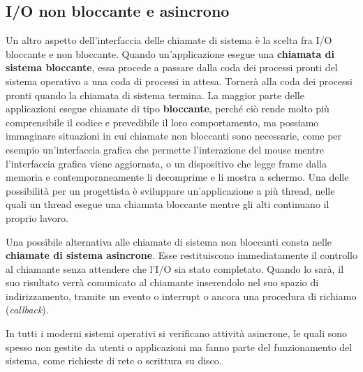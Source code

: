     \subsection{I/O non bloccante e asincrono}
        Un altro aspetto dell'interfaccia delle chiamate di sistema è la scelta fra I/O bloccante e non bloccante. Quando un'applicazione esegue una \textbf{chiamata di sistema bloccante}, essa procede a passare dalla coda dei processi pronti del sistema operativo a una coda di processi in attesa. Tornerà alla coda dei processi pronti quando la chiamata di sistema termina. La maggior parte delle applicazioni esegue chiamate di tipo \textbf{bloccante}, perché ciò rende molto più comprensibile il codice e prevedibile il loro comportamento, ma possiamo immaginare situazioni in cui chiamate non bloccanti sono necessarie, come per esempio un'interfaccia grafica che permette l'interazione del mouse mentre l'interfaccia grafica viene aggiornata, o un dispositivo che legge frame dalla memoria e contemporaneamente li decomprime e li mostra a schermo. Una delle possibilità per un progettista è sviluppare un'applicazione a più thread, nelle quali un thread esegue una chiamata bloccante mentre gli alti continuano il proprio lavoro.
        
        Una possibile alternativa alle chiamate di sistema non bloccanti consta nelle \textbf{chiamate di sistema asincrone}. Esse restituiscono immediatamente il controllo al chiamante senza attendere che l'I/O sia stato completato. Quando lo sarà, il suo risultato verrà comunicato al chiamante inserendolo nel suo spazio di indirizzamento, tramite un evento o interrupt o ancora una procedura di richiamo (\textit{callback}).
        
        In tutti i moderni sistemi operativi si verificano attività asincrone, le quali sono spesso non gestite da utenti o applicazioni ma fanno parte del funzionamento del sistema, come richieste di rete o scrittura su disco.